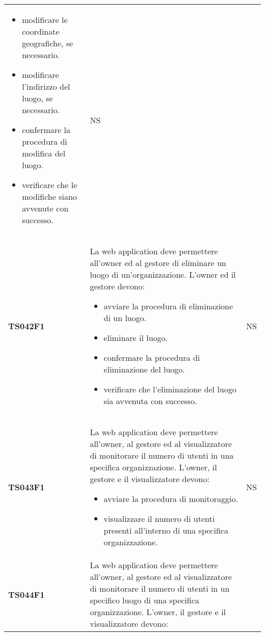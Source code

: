 \documentclass[../piano-di-qualifica.tex]{subfiles}
\begin{document}
\begin{centering}
\begin{longtable}[H]{>{\centering\bfseries}m{3cm} >{}p{10cm} >{\centering\arraybackslash}m{3cm}}
\begin{itemize}
                        \item modificare le coordinate geografiche, se necessario.
                        \item modificare l'indirizzo del luogo, se necessario.
                        \item confermare la procedura di modifica del luogo.
                        \item verificare che le modifiche siano avvenute con successo.
                      \end{itemize}
                    & NS \\
        TS042F1     & La web application deve permettere all'owner ed al gestore di eliminare un luogo di un'organizzazione. \newline
                      L'owner ed il gestore devono:
                      \begin{itemize}
                        \item avviare la procedura di eliminazione di un luogo.
                        \item eliminare il luogo.
                        \item confermare la procedura di eliminazione del luogo.
                        \item verificare che l'eliminazione del luogo sia avvenuta con successo.
                      \end{itemize}
                    & NS \\
        TS043F1     & La web application deve permettere all'owner, al gestore ed al visualizzatore di monitorare il numero di utenti in una specifica organizzazione. \newline
                      L'owner, il gestore e il visualizzatore devono:
                      \begin{itemize}
                        \item avviare la procedura di monitoraggio.
                        \item visualizzare il numero di utenti presenti all'interno di una specifica organizzazione.
                      \end{itemize}
                    & NS \\
        TS044F1     & La web application deve permettere all'owner, al gestore ed al visualizzatore di monitorare il numero di utenti in un specifico luogo di una specifica organizzazione. \newline
                      L'owner, il gestore e il visualizzatore devono:

\end{longtable}
\end{centering}
\end{document}
